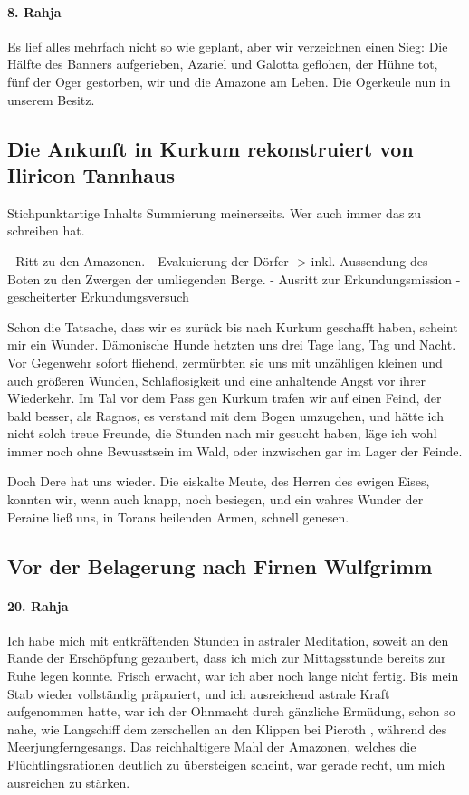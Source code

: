 \paragraph{8. Rahja}
Es lief alles mehrfach nicht so wie geplant, aber wir verzeichnen einen Sieg: Die Hälfte des Banners aufgerieben, Azariel und Galotta geflohen, der Hühne tot, fünf der Oger gestorben, wir und die Amazone am Leben. Die Ogerkeule nun in unserem Besitz.

\subsection{Die Ankunft in Kurkum rekonstruiert von Iliricon Tannhaus}

Stichpunktartige Inhalts Summierung meinerseits. Wer auch immer das zu schreiben hat.

- Ritt zu den Amazonen.
- Evakuierung der Dörfer
-> inkl. Aussendung des Boten zu den Zwergen der umliegenden Berge.
- Ausritt zur Erkundungsmission
- gescheiterter Erkundungsversuch

Schon die Tatsache, dass wir es zurück bis nach Kurkum geschafft haben, scheint mir ein Wunder.
Dämonische Hunde hetzten uns drei Tage lang, Tag und Nacht. Vor Gegenwehr sofort fliehend, zermürbten sie uns mit unzähligen kleinen und auch größeren Wunden, Schlaflosigkeit und eine anhaltende Angst vor ihrer Wiederkehr. Im Tal vor dem Pass gen Kurkum trafen wir auf einen Feind, der bald besser, als Ragnos, es verstand mit dem Bogen umzugehen, und hätte ich nicht solch treue Freunde, die Stunden nach mir gesucht haben, läge ich wohl immer noch ohne Bewusstsein im Wald, oder inzwischen gar im Lager der Feinde.

Doch Dere hat uns wieder. Die eiskalte Meute, des Herren des ewigen Eises, konnten wir, wenn auch knapp, noch besiegen, und ein wahres Wunder der Peraine ließ uns, in Torans heilenden Armen, schnell genesen.

\subsection{Vor der Belagerung nach Firnen Wulfgrimm}

\paragraph{20. Rahja}
Ich habe mich mit entkräftenden Stunden in astraler Meditation, soweit an den Rande der Erschöpfung gezaubert, dass ich mich zur Mittagsstunde bereits zur Ruhe legen konnte. Frisch erwacht, war ich aber noch lange nicht fertig. Bis mein Stab wieder vollständig präpariert, und ich ausreichend astrale Kraft aufgenommen hatte, war ich der Ohnmacht durch gänzliche Ermüdung, schon so nahe, wie Langschiff dem zerschellen an den Klippen bei Pieroth , während des Meerjungferngesangs. Das reichhaltigere Mahl der Amazonen, welches die Flüchtlingsrationen deutlich zu übersteigen scheint, war gerade recht, um mich ausreichen zu stärken.


